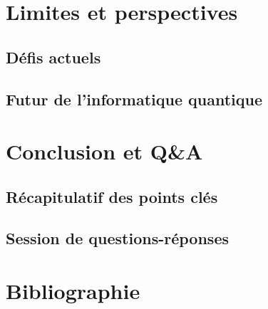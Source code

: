 \documentclass{article}
\begin{document}
\break\section{Limites et perspectives}
\subsection{Défis actuels}
\subsection{Futur de l'informatique quantique}

\break\section{Conclusion et Q\&A}
\subsection{Récapitulatif des points clés}
\subsection{Session de questions-réponses}

\break\section{Bibliographie}
\printbibliography
\end{document}
